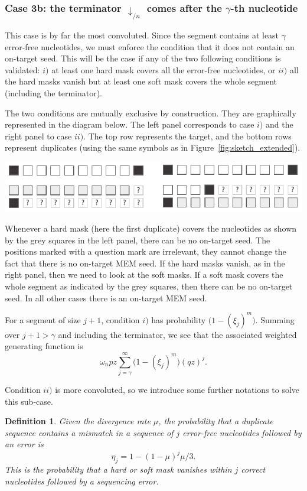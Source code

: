 \documentclass{article}
\newtheorem{definition}{Definition}
\newenvironment{inset}
{\vspace{0.5\baselineskip}\begin{center}}
{\end{center}\vspace{0.5\baselineskip}}
\begin{document}
\subsubsection*{Case 3b: the terminator $\downarrow_{/n}$ comes after the
$\gamma$-th nucleotide}

This case is by far the most convoluted. Since the segment contains at
least $\gamma$ error-free nucleotides, we must enforce the condition that
it does not contain an on-target seed. This will be the case if any of the
two following conditions is validated: $i)$ at least one hard mask covers
all the error-free nucleotides, or $ii)$ all the hard masks vanish but at
least one soft mask covers the whole segment (including the terminator).

The two conditions are mutually exclusive by construction. They are
graphically represented in the diagram below. The left panel corresponds
to case $i)$ and the right panel to case $ii)$. The top row represents the
target, and the bottom rows represent duplicates (using the same symbols
as in Figure~\ref{fig:sketch_extended}).
\begin{inset}
\includegraphics{masks.pdf}
\end{inset}

Whenever a hard mask (here the first duplicate) covers the nucleotides as
shown by the grey squares in the left panel, there can be no on-target
seed. The positions marked with a question mark are irrelevant, they
cannot change the fact that there is no on-target MEM seed. If the hard
masks vanish, as in the right panel, then we need to look at the soft
masks. If a soft mask covers the whole segment as indicated by the grey
squares, then there can be no on-target seed. In all other cases there is
an on-target MEM seed.

For a segment of size $j+1$, condition $i)$ has probability $\big(1 -
(\xi_j)^m \big)$. Summing over $j+1 > \gamma$ and including the
terminator, we see that the associated weighted generating function is
\begin{equation*}
\omega_n pz \sum_{j=\gamma}^\infty \Big(1 - (\xi_j)^m \Big) (qz)^j.
\end{equation*}

Condition $ii)$ is more convoluted, so we introduce some further
notations to solve this sub-case.
\begin{definition}
Given the divergence rate $\mu$, the probability that a duplicate sequence
contains a mismatch in a sequence of $j$ error-free nucleotides followed
by an error is
\begin{equation}
\label{eq:eta}
\eta_j = 1-(1-\mu)^j\mu/3.
\end{equation}
This is the probability that a hard or soft mask vanishes within $j$
correct nucleotides followed by a sequencing error.
\end{definition}
\end{document}
